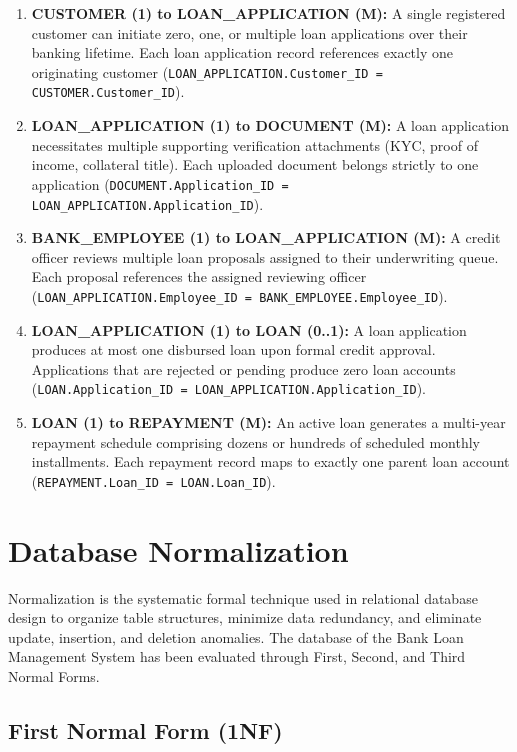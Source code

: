 \begin{enumerate}
  \item \textbf{CUSTOMER (1) to LOAN\_APPLICATION (M):} A single registered customer can initiate zero, one, or multiple loan applications over their banking lifetime. Each loan application record references exactly one originating customer (\texttt{LOAN\_APPLICATION.Customer\_ID = CUSTOMER.Customer\_ID}).
  \item \textbf{LOAN\_APPLICATION (1) to DOCUMENT (M):} A loan application necessitates multiple supporting verification attachments (KYC, proof of income, collateral title). Each uploaded document belongs strictly to one application (\texttt{DOCUMENT.Application\_ID = LOAN\_APPLICATION.Application\_ID}).
  \item \textbf{BANK\_EMPLOYEE (1) to LOAN\_APPLICATION (M):} A credit officer reviews multiple loan proposals assigned to their underwriting queue. Each proposal references the assigned reviewing officer (\texttt{LOAN\_APPLICATION.Employee\_ID = BANK\_EMPLOYEE.Employee\_ID}).
  \item \textbf{LOAN\_APPLICATION (1) to LOAN (0..1):} A loan application produces at most one disbursed loan upon formal credit approval. Applications that are rejected or pending produce zero loan accounts (\texttt{LOAN.Application\_ID = LOAN\_APPLICATION.Application\_ID}).
  \item \textbf{LOAN (1) to REPAYMENT (M):} An active loan generates a multi-year repayment schedule comprising dozens or hundreds of scheduled monthly installments. Each repayment record maps to exactly one parent loan account (\texttt{REPAYMENT.Loan\_ID = LOAN.Loan\_ID}).
\end{enumerate}

\section{Database Normalization}

Normalization is the systematic formal technique used in relational database design to organize table structures, minimize data redundancy, and eliminate update, insertion, and deletion anomalies. The database of the Bank Loan Management System has been evaluated through First, Second, and Third Normal Forms.

\subsection{First Normal Form (1NF)}

